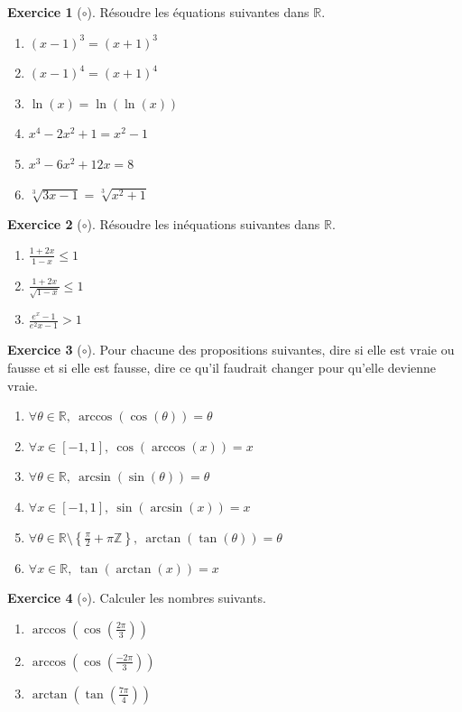 \documentclass[french]{book}
\newcommand{\Z}{\mathbb{Z}}
\newcommand{\R}{\mathbb{R}}
\theoremstyle{definition}
\newtheorem{ex}{Exercice}[chapter]
\theoremstyle{theorem}
\theoremstyle{remark}
\begin{document}
\begin{ex}[$\circ$]
	Résoudre les équations suivantes dans $\R$.
	\begin{enumerate}
		\item $(x-1)^3=(x+1)^3$
		\item $(x-1)^4=(x+1)^4$
		\item $\ln(x)=\ln(\ln(x))$
		\item $x^4-2x^2+1=x^2-1$
		\item $x^3-6x^2+12x=8$
		\item $\sqrt[3]{3x-1}=\sqrt[3]{x^2+1}$
	\end{enumerate}
\end{ex}

\begin{ex}[$\circ$]
	Résoudre les inéquations suivantes dans $\R$.
	\begin{enumerate}
		\item $\displaystyle\frac{1+2x}{1-x}\leqslant 1$
		\item $\displaystyle\frac{1+2x}{\sqrt{1-x}}\leqslant 1$
		\item $\displaystyle\frac{e^x-1}{e^2x-1}>1$
	\end{enumerate}
\end{ex}

\begin{ex}[$\circ$]
	Pour chacune des propositions suivantes, dire si elle est vraie ou fausse et si elle est fausse, dire ce qu'il faudrait changer pour qu'elle devienne vraie.
	\begin{enumerate}
		\item $\forall\theta\in\R,\ \arccos(\cos(\theta))=\theta$
		\item $\forall x\in[-1,1],\ \cos(\arccos(x))=x$
		\item $\forall\theta\in\R,\ \arcsin(\sin(\theta))=\theta$
		\item $\forall x\in[-1,1],\ \sin(\arcsin(x))=x$
		\item $\forall\theta\in\R\setminus\displaystyle\left\{\frac{\pi}{2}+\pi\Z\right\},\ \arctan(\tan(\theta))=\theta$
		\item $\forall x\in\R,\ \tan(\arctan(x))=x$
	\end{enumerate}
\end{ex}

\begin{ex}[$\circ$]
	Calculer les nombres suivants.
	\begin{enumerate}
		\item $\displaystyle\arccos\left(\cos\left(\frac{2\pi}{3}\right)\right)$
		\item $\displaystyle\arccos\left(\cos\left(\frac{-2\pi}{3}\right)\right)$
		\item $\displaystyle\arctan\left(\tan\left(\frac{7\pi}{4}\right)\right)$
	\end{enumerate}
\end{ex}
\end{document}
